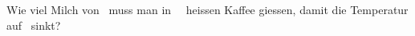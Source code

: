Wie viel Milch von \TMO\ muss man in \VKO\ \TKO\ heissen Kaffee giessen, damit die Temperatur auf \TmO\ sinkt?
